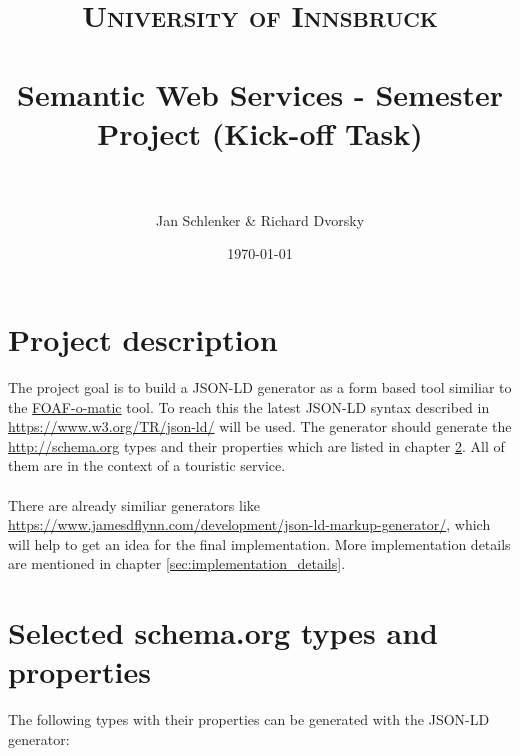 \documentclass[paper=a4, fontsize=12pt]{scrartcl} %
\title{	
\normalfont \normalsize 
\textsc{University of Innsbruck} \\ [25pt] %
\horrule{0.5pt} \\[0.4cm] %
\huge Semantic Web Services - Semester Project (Kick-off Task) \\ %
\horrule{2pt} \\[0.5cm] %
}
\author{Jan Schlenker \& Richard Dvorsky} %
\date{\normalsize\today} %
\numberwithin{equation}{section} %
\numberwithin{figure}{section} %
\numberwithin{table}{section} %
\begin{document}
\maketitle %


\section{Project description}
\label{sec:project_description}

The project goal is to build a JSON-LD generator as a form based tool similiar to the \href{http://www.ldodds.com/foaf/foaf-a-matic}{FOAF-o-matic} tool. To reach this the latest JSON-LD syntax described in \href{https://www.w3.org/TR/json-ld/}{https://\allowbreak{}www.\allowbreak{}w3.\allowbreak{}org/\allowbreak{}TR/\allowbreak{}json-ld/} will be used. The generator should generate the \href{http://schema.org}{http://schema.org} types and their properties which are listed in chapter \ref{sec:types_and_properties}. All of them are in the context of a touristic service.\\
\\
There are already similiar generators like \href{https://www.jamesdflynn.com/development/json-ld-markup-generator/}{https://\allowbreak{}www.\allowbreak{}jamesdflynn.\allowbreak{}com/\allowbreak{}development/\allowbreak{}json-ld-markup-generator/}, which will help to get an idea for the final implementation. More implementation details are mentioned in chapter \ref{sec:implementation_details}.


\section{Selected schema.org types and properties}
\label{sec:types_and_properties}

The following types with their properties can be generated with the JSON-LD generator:
\end{document}
